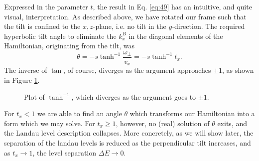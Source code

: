 Expressed in the parameter \(t\), the result in Eq. \eqref{eq:49} has an intuitive, and quite visual, interpretation.
As described above, we have rotated our frame such that the tilt is confined to the \(x,z\)-plane, i.e. no tilt in the \(y\)-direction.
The required hyperbolic tilt angle to eliminate the \(k^B_{x}\) in the diagonal elements of the Hamiltonian, originating from the tilt, was
\begin{equation}
  \label{eq:51}
  \theta = - s \tanh^{-1} \frac{\omega_{\perp}}{v_{x}} = - s \tanh^{-1} t_{x}.
\end{equation}
The inverse of \(\tan \), of course, diverges as the argument approaches \(\pm 1\), as shown in Figure \ref{fig:arctanh}.
\begin{figure}[ht]
  \centering
  \caption{\label{fig:arctanh} Plot of \(\tanh^{-1}\), which diverges as the argument goes to \(\pm 1\).}
\end{figure}
For \(t_{x} < 1\) we are able to find an angle \(\theta \) which transforms our Hamiltonian into a form which we may solve.
For \(t_{x} \geq 1\), however, no (real) solution of \(\theta \) exits, and the Landau level description collapses.
More concretely, as we will show later, the separation of the landau levels is reduced as the perpendicular tilt increases, and as \( t_x \to 1 \), the level separation \( \Delta E \to 0 \).




